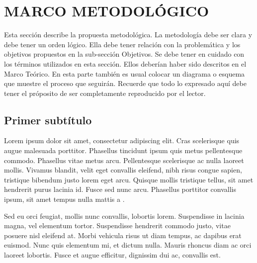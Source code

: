 \documentclass[../main.tex]{subfiles}
\begin{document}
\chapter{MARCO METODOLÓGICO}

Esta sección describe la propuesta metodológica. La metodología debe ser clara y debe tener un orden lógico. Ella debe tener relación con la problemática y los objetivos propuestos en la sub-sección Objetivos. Se debe tener en cuidado con los términos utilizados en esta sección. Ellos deberían haber sido descritos en el Marco Teórico. En esta parte también es usual colocar un diagrama o esquema que muestre el proceso que seguirán. Recuerde que todo lo expresado aquí debe tener el próposito de ser completamente reproducido por el lector. 

\section{Primer subtítulo}

Lorem ipsum dolor sit amet, consectetur adipiscing elit. Cras scelerisque quis augue malesuada porttitor. Phasellus tincidunt ipsum quis metus pellentesque commodo. Phasellus vitae metus arcu. Pellentesque scelerisque ac nulla laoreet mollis. Vivamus blandit, velit eget convallis eleifend, nibh risus congue sapien, tristique bibendum justo lorem eget arcu. Quisque mollis tristique tellus, sit amet hendrerit purus lacinia id. Fusce sed nunc arcu. Phasellus porttitor convallis ipsum, sit amet tempus nulla mattis a \cite{Reumann2012}.

Sed eu orci feugiat, mollis nunc convallis, lobortis lorem. Suspendisse in lacinia magna, vel elementum tortor. Suspendisse hendrerit commodo justo, vitae posuere nisl eleifend at. Morbi vehicula risus ut diam tempus, ac dapibus erat euismod. Nunc quis elementum mi, et dictum nulla. Mauris rhoncus diam ac orci laoreet lobortis. Fusce et augue efficitur, dignissim dui ac, convallis est.
\end{document}
